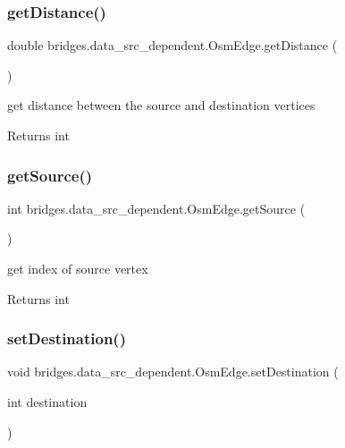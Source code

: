 \subsubsection{\texorpdfstring{get\+Distance()}{getDistance()}}
{\footnotesize\ttfamily double bridges.\+data\+\_\+src\+\_\+dependent.\+Osm\+Edge.\+get\+Distance (\begin{DoxyParamCaption}{ }\end{DoxyParamCaption})}

get distance between the source and destination vertices \begin{DoxyReturn}{Returns}
int 
\end{DoxyReturn}
\mbox{\label{classbridges_1_1data__src__dependent_1_1_osm_edge_a4ffc915a30144db8e3c1521772a6a26d}} 
\subsubsection{\texorpdfstring{get\+Source()}{getSource()}}
{\footnotesize\ttfamily int bridges.\+data\+\_\+src\+\_\+dependent.\+Osm\+Edge.\+get\+Source (\begin{DoxyParamCaption}{ }\end{DoxyParamCaption})}

get index of source vertex \begin{DoxyReturn}{Returns}
int 
\end{DoxyReturn}
\mbox{\label{classbridges_1_1data__src__dependent_1_1_osm_edge_a0bfcd0bd6dc7a4e97a078a67e41df445}} 
\subsubsection{\texorpdfstring{set\+Destination()}{setDestination()}}
{\footnotesize\ttfamily void bridges.\+data\+\_\+src\+\_\+dependent.\+Osm\+Edge.\+set\+Destination (\begin{DoxyParamCaption}\item[{int}]{destination }\end{DoxyParamCaption})}

